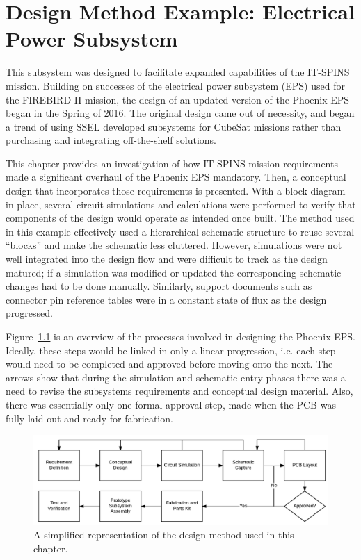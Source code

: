 \chapter{Design Method Example: Electrical Power Subsystem}\label{CH:Design2}

This subsystem was designed to facilitate expanded capabilities of the IT-SPINS mission. Building on successes of the electrical power subsystem (EPS) used for the FIREBIRD-II mission, the design of an updated version of the Phoenix EPS began in the Spring of 2016. The original design came out of necessity, and began a trend of using SSEL developed subsystems for CubeSat missions rather than purchasing and integrating off-the-shelf solutions. 

This chapter provides an investigation of how IT-SPINS mission requirements made a significant overhaul of the Phoenix EPS mandatory. Then, a conceptual design that incorporates those requirements is presented. With a block diagram in place, several circuit simulations and calculations were performed to verify that components of the design would operate as intended once built. The method used in this example effectively used a hierarchical schematic structure to reuse several ``blocks'' and make the schematic less cluttered. However, simulations were not well integrated into the design flow and were difficult to track as the design matured; if a simulation was modified or updated the corresponding schematic changes had to be done manually. Similarly, support documents such as connector pin reference tables were in a constant state of flux as the design progressed.

Figure~\ref{fig:eps_flow} is an overview of the processes involved in designing the Phoenix EPS. Ideally, these steps would be linked in only a linear progression, i.e. each step would need to be completed and approved before moving onto the next. The arrows show that during the simulation and schematic entry phases there was a need to revise the subsystems requirements and conceptual design material. Also, there was essentially only one formal approval step, made when the PCB was fully laid out and ready for fabrication.

\begin{figure}[htbp]
	\centering
	\includegraphics[width=\textwidth]{../figs/phoenix/concept/eps_flow.pdf}
	\caption{A simplified representation of the design method used in this chapter.}
	\label{fig:eps_flow}
\end{figure}

